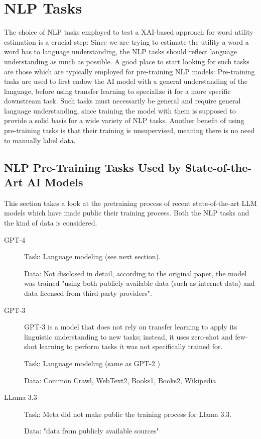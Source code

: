 \section{NLP Tasks}
The choice of NLP tasks employed to test a XAI-based approach for word utility estimation is a crucial step:
Since we are trying to estimate the utility a word a word has to language understanding, the NLP tasks should reflect language understanding as much as possible.
A good place to start looking for such tasks are those which are typically employed for pre-training NLP models:
Pre-training tasks are used to first endow the AI model with a general understanding of the language, before using transfer learning to specialize it for a more specific downstream task.
Such tasks must necessarily be general and require general language understanding, since training the model with them is supposed to provide a solid basis for a wide variety of NLP tasks.
Another benefit of using pre-training tasks is that their training is unsupervised, meaning there is no need to manually label data.

\subsection{NLP Pre-Training Tasks Used by State-of-the-Art AI Models}
This section takes a look at the pretraining process of recent state-of-the-art LLM models which have made public their training process.
Both the NLP tasks and the kind of data is considered.


\begin{description}
	\item[GPT-4] \cite{openaiGPT4TechnicalReport2024}

	      Task: Language modeling (see next section).

	      Data: Not disclosed in detail, according to the original paper, the model was trained "using both publicly available data (such as internet data) and data licensed from third-party providers".
	\item[GPT-3] \cite{brownLanguageModelsAre2020}
	      GPT-3 is a model that does not rely on transfer learning to apply its linguistic understanding to new tasks; instead, it uses zero-shot and few-shot learning to perform tasks it was not specifically trained for.

	      Task: Language modeling (same as GPT-2 \cite{radfordLanguageModelsAre2019})

	      Data: Common Crawl, WebText2, Books1, Books2, Wikipedia 
	\item[LLama 3.3] \cite{LlamamodelsModelsLlama3_3}


	      Task: Meta did not make public the training process for Llama 3.3.

	      Data: "data from publicly available sources"
\end{description}

